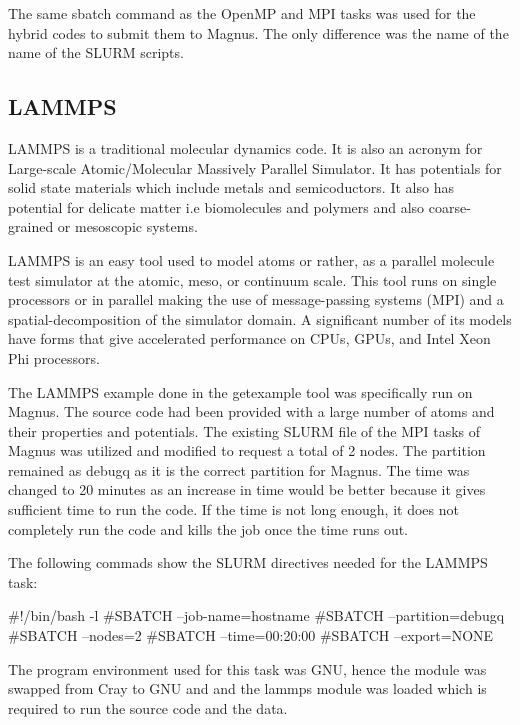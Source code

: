 \documentclass[journal]{IEEEtran}
\begin{document}
The same sbatch command as the OpenMP and MPI tasks was used for the hybrid codes to submit them to Magnus. The only difference was the name of the name
of the SLURM scripts.


\subsection{LAMMPS}

LAMMPS is a traditional molecular dynamics code. It is also an acronym for Large-scale Atomic/Molecular Massively Parallel Simulator. It has potentials
for solid state materials which include metals and semicoductors. It also has potential for delicate matter i.e biomolecules and polymers and also
coarse-grained or mesoscopic systems.

LAMMPS is an easy tool used to model atoms or rather, as a parallel molecule test simulator at the atomic, meso, or continuum scale. This tool runs on
single processors or in parallel making the use of message-passing systems (MPI) and a spatial-decomposition of the simulator domain. A significant
number of its models have forms that give accelerated performance on CPUs, GPUs, and Intel Xeon Phi processors.

The LAMMPS example done in the getexample tool was specifically run on Magnus. The source code had been provided with a large number of atoms and their
properties and potentials. The existing SLURM file of the MPI tasks of Magnus was utilized and modified to request a total of 2 nodes. The partition
remained as debugq as it is the correct partition for Magnus. The time was changed to 20 minutes as an increase in time would be better because it gives
sufficient time to run the code. If the time is not long enough, it does not completely run the code and kills the job once the time runs out.

The following commads show the SLURM directives needed for the LAMMPS task:




#!/bin/bash -l
#SBATCH --job-name=hostname
#SBATCH --partition=debugq
#SBATCH --nodes=2
#SBATCH --time=00:20:00
#SBATCH --export=NONE

The program environment used for this task was GNU, hence the module was swapped from Cray to GNU and and the lammps module was loaded which is required
to run the source code and the data.
\end{document}
